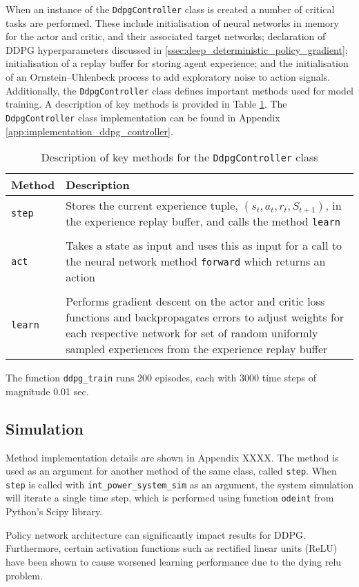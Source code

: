 When an instance of the \verb|DdpgController| class is created a number of critical tasks are performed. These include initialisation of neural networks in memory for the actor and critic, and their associated target networks; declaration of DDPG hyperparameters discussed in \textsection \ref{ssec:deep_deterministic_policy_gradient}; initialisation of a replay buffer for storing agent experience; and the initialisation of an Ornstein–Uhlenbeck process to add exploratory noise to action signals. Additionally, the \verb|DdpgController| class defines important methods used for model training. A description of key methods is provided in Table \ref{tab:4103}. The \verb|DdpgController| class implementation can be found in Appendix \ref{app:implementation_ddpg_controller}.

\begin{table}[h]
	\centering
	\cprotect\caption{Description of key methods for the \verb|DdpgController| class}
	\begin{tabular}{lp{12cm}}
		\toprule
		\textbf{Method} & \textbf{Description} \\
		\midrule
		\verb|step| & Stores the current experience tuple, $(s_t, a_t, r_t, S_{t+1})$, in the experience replay buffer, and calls the method \verb|learn|\\
		 & \\
		\verb|act| & Takes a state as input and uses this as input for a call to the neural network method \verb|forward| which returns an action\\
		 & \\
		\verb|learn| & Performs gradient descent on the actor and critic loss functions and backpropagates errors to adjust weights for each respective network for set of random uniformly sampled experiences from the experience replay buffer\\
		\bottomrule
	\end{tabular}\label{tab:4103}
\end{table} 

The function \verb|ddpg_train| runs 200 episodes, each with 3000 time steps of magnitude 0.01 sec.


\subsection{Simulation}
Method implementation details are shown in Appendix XXXX. The method is used as an argument for another method of the same class, called \verb|step|. When \verb|step| is called with \verb|int_power_system_sim| as an argument, the system simulation will iterate a single time step, which is performed using function \verb|odeint| from Python's Scipy library.




Policy network architecture can significantly impact results for DDPG. Furthermore, certain activation functions such as rectified linear units (ReLU) have been shown to cause worsened learning performance due to the dying relu problem.